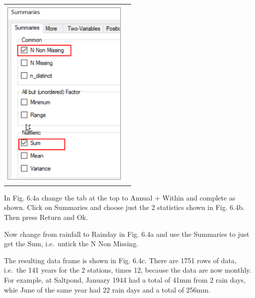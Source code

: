 \documentclass[
  letterpaper,
  DIV=11,
  numbers=noendperiod]{scrreprt}
\begin{document}
\begin{longtable}[]{@{}
  >{\raggedright\arraybackslash}p{}
  >{\raggedright\arraybackslash}p{}@{}}
\includegraphics[width=2.37512in,height=3.68769in]{figures/Fig6.4b.png} \\
\end{longtable}

In Fig. 6.4a change the tab at the top to Annual + Within and complete
as shown. Click on Summaries and choose just the 2 statistics shown in
Fig. 6.4b. Then press Return and Ok.

Now change from rainfall to Rainday in Fig. 6.4a and use the Summaries
to just get the Sum, i.e.~untick the N Non Missing.

The resulting data frame is shown in Fig. 6.4c. There are 1751 rows of
data, i.e.~the 141 years for the 2 stations, times 12, because the data
are now monthly. For example, at Saltpond, January 1944 had a total of
41mm from 2 rain days, whie June of the same year had 22 rain days and a
total of 256mm.
\end{document}
